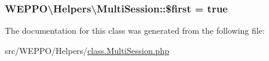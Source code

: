 \subsubsection[{\texorpdfstring{\$first}{$first}}]{\setlength{\rightskip}{0pt plus 5cm}W\+E\+P\+P\+O\textbackslash{}\+Helpers\textbackslash{}\+Multi\+Session\+::\$first = true\hspace{0.3cm}{\ttfamily [static]}}\hypertarget{classWEPPO_1_1Helpers_1_1MultiSession_a1431b5eb9becee142a6b1823a196a2ad}{}\label{classWEPPO_1_1Helpers_1_1MultiSession_a1431b5eb9becee142a6b1823a196a2ad}


The documentation for this class was generated from the following file\+:\begin{DoxyCompactItemize}
\item 
src/\+W\+E\+P\+P\+O/\+Helpers/\hyperlink{class_8MultiSession_8php}{class.\+Multi\+Session.\+php}\end{DoxyCompactItemize}
